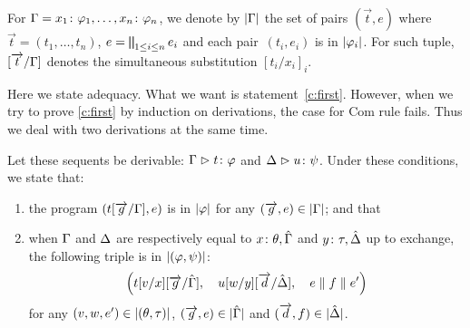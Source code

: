 For $\Gamma = {x_1} \colon{\varphi_1},\ldots,{x_n} \colon{\varphi_n}$,
we denote by $|{\Gamma}|$ the set of pairs $(\vec t,e)$ where
$\vec{t} = (t_1,\dots,t_n)$, $e = \bigparallel_{1\le i\le n} e_i$
 and each pair~$(t_i, e_i)$ is in $|{\varphi_i}|$.
For such tuple, $[\overrightarrow{t}/\Gamma]$ denotes the simultaneous substitution
$[t_i/x_i]_{i}$.

Here we state adequacy.  What we want is statement~\ref{c:first}.
However, when we try to prove \ref{c:first} by induction on derivations,
the case for Com rule fails.  Thus we deal with two derivations at the
same time.

\begin{theorem}[Adequacy]
 \label{c:adequacy}
 Let these sequents be derivable:
 $  {\Gamma}\vartriangleright{ {t} \colon{\varphi} } $
 and
 $  {\Delta}\vartriangleright{ {u} \colon{\psi} }$\enspace.
 Under these conditions, we state that:
 \begin{enumerate}[label=(\arabic{*}), ref=\textit{(\arabic{*})}]
  \item \label{c:first} the program
	$
	(t[\overrightarrow{g}/\Gamma], e)
	$
	is in $|{\varphi}|$
	 for any
	$(\overrightarrow{g},e)\in|{\Gamma}|$; and that
  \item \label{c:second}
	when $\Gamma$ and $\Delta$ are respectively
	equal to ${x} \colon{\theta}, \hat{\Gamma}$ and ${y} \colon{\tau}, \hat{\Delta}$ up to exchange,
	the following triple is in $|{(\varphi,\psi)}|$:
	\[\left(
	t[v/x][\overrightarrow g/\hat {\Gamma}],\quad
	u[w/y][\overrightarrow d/\hat {\Delta}],\quad
	 e \parallel  f \parallel e'
	\right)
	\]
	for any
	$(v,w,e')\in|{(\theta,\tau)}|$,
	$(\overrightarrow g, e)\in|{\hat{\Gamma}}|$ and
	$(\overrightarrow d, f)\in|{\hat{\Delta}}|$.
  \end{enumerate}
\end{theorem}
